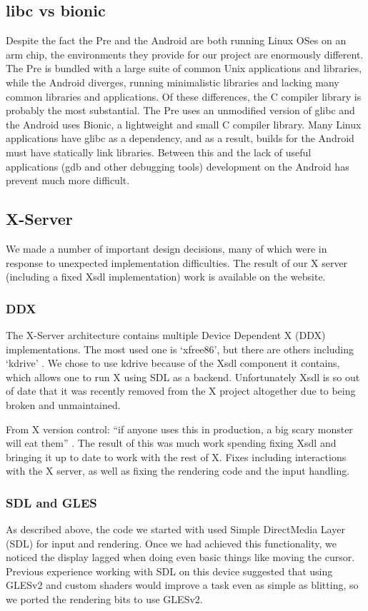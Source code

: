 \subsection{libc vs bionic}
Despite the fact the Pre and the Android are both running Linux OSes on an arm chip, the environments they provide for our project are enormously different.  The Pre is bundled with a large suite of common Unix applications and libraries, while the Android diverges, running minimalistic libraries and lacking many common libraries and applications.  Of these differences, the C compiler library is probably the most substantial. The Pre uses an unmodified version of glibc and the Android uses Bionic, a lightweight and small C compiler library.  Many Linux applications have glibc as a dependency, and as a result, builds for the Android must have statically link libraries.  Between this and the lack of useful applications (gdb and other debugging tools) development on the Android has prevent much more difficult.  

\subsection{X-Server}

We made a number of important design decisions, many of which were in response to unexpected implementation difficulties.  The result of our X server (including a fixed Xsdl implementation) work is available on the website.
\subsubsection{DDX}
The X-Server architecture contains multiple Device Dependent X (DDX) implementations.  The most used one is `xfree86', but there are others including `kdrive' \cite{x_glossary}.  We chose to use kdrive because of the Xsdl component it contains, which allows one to run X using SDL as a backend.  Unfortunately Xsdl is so out of date that it was recently removed from the X project altogether due to being broken and unmaintained.

From X version control: ``if anyone uses this in production, a big scary monster will eat them'' \cite{x_quote}.  The result of this was much work spending fixing Xsdl and bringing it up to date to work with the rest of X.  Fixes including interactions with the X server, as well as fixing the rendering code and the input handling.
\subsubsection{SDL and GLES}
As described above, the code we started with used Simple DirectMedia Layer (SDL) \cite{sdl} for input and rendering.  Once we had achieved this functionality, we noticed the display lagged when doing even basic things like moving the cursor.  Previous experience working with SDL on this device suggested that using GLESv2 \cite{gles} and custom shaders would improve a task even as simple as blitting, so we ported the rendering bits to use GLESv2.


